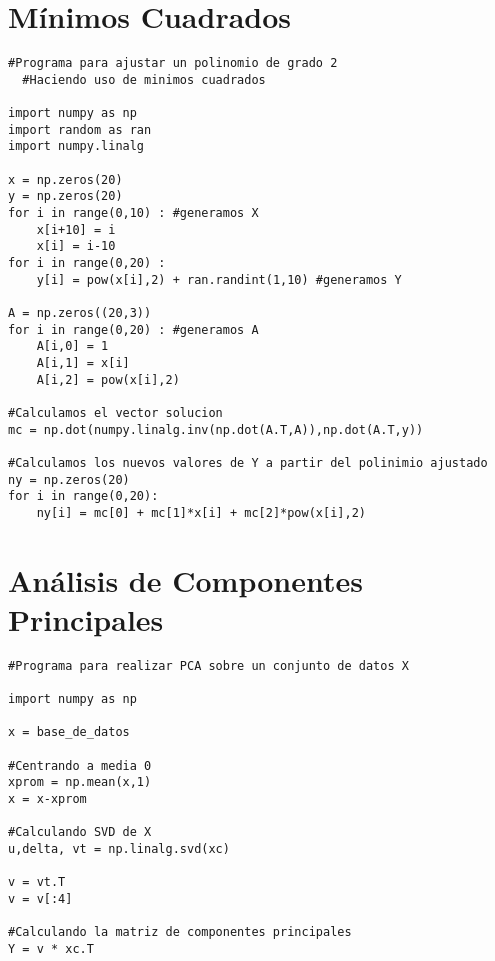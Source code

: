 \begin{appendices}

\section{Mínimos Cuadrados}\label{Cminimos}

\lstset{language=Python, breaklines=true, basicstyle=\footnotesize}
\begin{lstlisting}[frame=single]
  #Programa para ajustar un polinomio de grado 2 
  #Haciendo uso de minimos cuadrados

import numpy as np
import random as ran
import numpy.linalg

x = np.zeros(20)
y = np.zeros(20)
for i in range(0,10) : #generamos X
    x[i+10] = i
    x[i] = i-10
for i in range(0,20) :
    y[i] = pow(x[i],2) + ran.randint(1,10) #generamos Y

A = np.zeros((20,3))
for i in range(0,20) : #generamos A
    A[i,0] = 1
    A[i,1] = x[i]
    A[i,2] = pow(x[i],2)

#Calculamos el vector solucion
mc = np.dot(numpy.linalg.inv(np.dot(A.T,A)),np.dot(A.T,y))

#Calculamos los nuevos valores de Y a partir del polinimio ajustado
ny = np.zeros(20)
for i in range(0,20): 
    ny[i] = mc[0] + mc[1]*x[i] + mc[2]*pow(x[i],2)
\end{lstlisting} 

\newpage


\section{Análisis de Componentes Principales}\label{Cpca}

\lstset{language=Python, breaklines=true, basicstyle=\footnotesize}
\begin{lstlisting}[frame=single]
  #Programa para realizar PCA sobre un conjunto de datos X

import numpy as np 

x = base_de_datos

#Centrando a media 0
xprom = np.mean(x,1)
x = x-xprom

#Calculando SVD de X 
u,delta, vt = np.linalg.svd(xc)

v = vt.T
v = v[:4]

#Calculando la matriz de componentes principales
Y = v * xc.T


\end{lstlisting}
\end{appendices}
